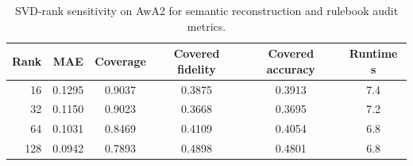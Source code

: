 \begin{table}[H]
\caption{SVD-rank sensitivity on AwA2 for semantic reconstruction and rulebook audit metrics.\label{tab:svd_rank_sensitivity}}
\centering
\small
\begin{tabular}{rccccc}
\toprule
Rank & MAE & Coverage & Covered fidelity & Covered accuracy & Runtime s \\
\midrule
16 & 0.1295 & 0.9037 & 0.3875 & 0.3913 & 7.4 \\
32 & 0.1150 & 0.9023 & 0.3668 & 0.3695 & 7.2 \\
64 & 0.1031 & 0.8469 & 0.4109 & 0.4054 & 6.8 \\
128 & 0.0942 & 0.7893 & 0.4898 & 0.4801 & 6.8 \\
\bottomrule
\end{tabular}
\end{table}

